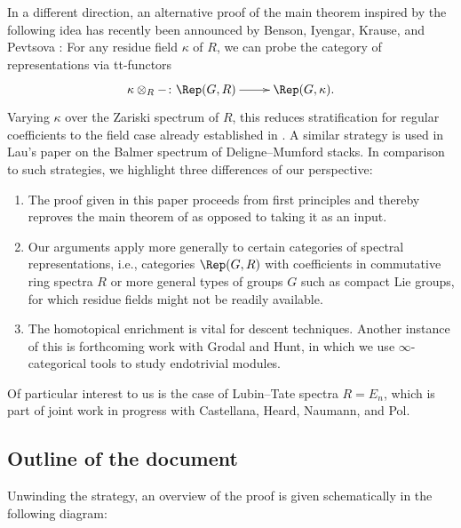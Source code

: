 \documentclass{amsart}%
\numberwithin{equation}{section}%
\theoremstyle{remark}
\newcounter{enum-resume-hack}
\begin{document}
In a different direction, an alternative proof of the main theorem inspired by the following idea has recently been announced by Benson, Iyengar, Krause, and Pevtsova \cite{bikp_fiberwisestratification}: For any residue field $\kappa$ of $R$, we can probe the category of representations via tt-functors
\[
\xymatrix{\kappa\otimes_R - \colon \Rep(G,R) \ar[r] & \Rep(G,\kappa).}
\]
Varying $\kappa$ over the Zariski spectrum of $R$, this reduces stratification for regular coefficients to the field case already established in \cite{BensonIyengarKrause11a}. A similar strategy is used in Lau's paper \cite{lau_spcdmstacks} on the Balmer spectrum of Deligne--Mumford stacks. In comparison to such strategies, we highlight three differences of our perspective: 
\begin{enumerate}
    \item The proof given in this paper proceeds from first principles and thereby reproves the main theorem of \cite{BensonIyengarKrause11a} as opposed to taking it as an input.
    \item Our arguments apply more generally to certain categories of spectral representations, i.e., categories $\Rep(G,R)$ with coefficients in commutative ring spectra $R$ or more general types of groups $G$ such as compact Lie groups, for which residue fields might not be readily available. 
    \item The homotopical enrichment is vital for descent techniques. Another instance of this is forthcoming work with Grodal and Hunt, in which we use $\infty$-categorical tools to study endotrivial modules. 
\end{enumerate}
Of particular interest to us is the case of Lubin--Tate spectra $R = E_n$, which is part of joint work in progress with Castellana, Heard, Naumann, and Pol. 

\subsection{Outline of the document}

Unwinding the strategy, an overview of the proof is given schematically in the following diagram:
\end{document}
